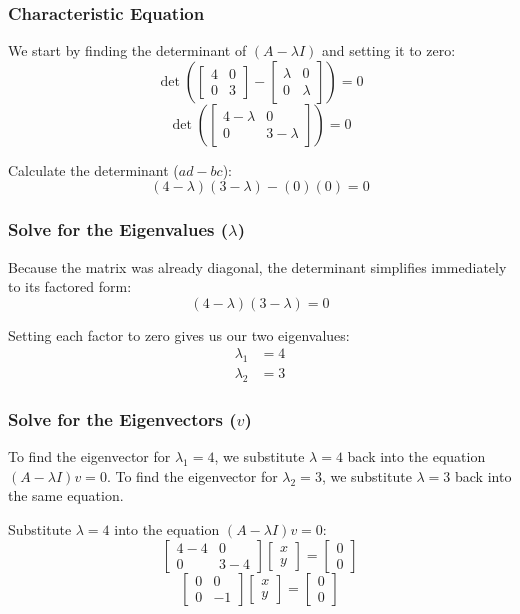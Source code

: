 \documentclass[twoside, 10pt]{article}
\begin{document}
\subsubsection{Characteristic Equation}
We start by finding the determinant of $(A - \lambda I)$ and setting it to zero:
\[ \det\left( \begin{bmatrix} 4 & 0 \\ 0 & 3 \end{bmatrix} - \begin{bmatrix} \lambda & 0 \\ 0 & \lambda \end{bmatrix} \right) = 0 \]
\[ \det\left( \begin{bmatrix} 4-\lambda & 0 \\ 0 & 3-\lambda \end{bmatrix} \right) = 0 \]

Calculate the determinant ($ad - bc$):
\[ (4-\lambda)(3-\lambda) - (0)(0) = 0 \]

\subsubsection{Solve for the Eigenvalues ($\lambda$)}
Because the matrix was already diagonal, the determinant simplifies immediately to its factored form:
\[ (4-\lambda)(3-\lambda) = 0 \]

Setting each factor to zero gives us our two eigenvalues:
\begin{align*}
    \lambda_1 &= 4 \\
    \lambda_2 &= 3
\end{align*}

\subsubsection{Solve for the Eigenvectors ($v$)}
To find the eigenvector for $\lambda_1 = 4$, we substitute $\lambda = 4$ back into the equation $(A - \lambda I)v = 0$. To find the eigenvector for $\lambda_2 = 3$, we substitute $\lambda = 3$ back into the same equation.

Substitute $\lambda = 4$ into the equation $(A - \lambda I)v = 0$:
\[ \begin{bmatrix} 4-4 & 0 \\ 0 & 3-4 \end{bmatrix} \begin{bmatrix} x \\ y \end{bmatrix} = \begin{bmatrix} 0 \\ 0 \end{bmatrix} \]
\[ \begin{bmatrix} 0 & 0 \\ 0 & -1 \end{bmatrix} \begin{bmatrix} x \\ y \end{bmatrix} = \begin{bmatrix} 0 \\ 0 \end{bmatrix} \]
\end{document}

